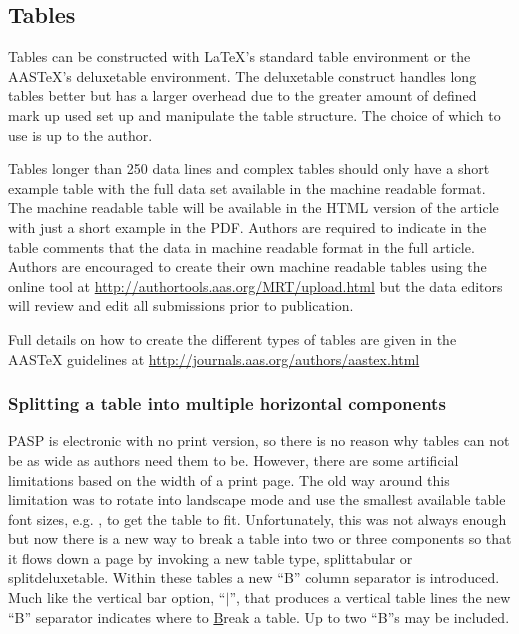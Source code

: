 \documentclass[linenumbers]{aastex631}
\newcommand\aastex{AAS\TeX}
\newcommand\latex{La\TeX}
\begin{document}
\subsection{Tables} \label{subsec:tables}

Tables can be constructed with \latex's standard table environment or the
\aastex's deluxetable environment. The deluxetable construct handles long
tables better but has a larger overhead due to the greater amount of
defined mark up used set up and manipulate the table structure.  The choice
of which to use is up to the author. 

Tables longer than 250 data lines and complex tables should only have a
short example table with the full data set available in the machine
readable format.  The machine readable table will be available in the HTML
version of the article with just a short example in the PDF. Authors are
required to indicate in the table comments that the data in machine 
readable format in the full article.
Authors are encouraged to create their own machine
readable tables using the online tool at
\url{http://authortools.aas.org/MRT/upload.html} but the data editors will review and edit all submissions prior to publication.

Full details on how to create the different types of tables are given in the AASTeX guidelines at \url{http://journals.aas.org/authors/aastex.html}

\subsubsection{Splitting a table into multiple horizontal components}

PASP is electronic with no print version, so there is
no reason why tables can not be as wide as authors need them to be.
However, there are some artificial limitations based on the width of a
print page.  The old way around this limitation was to rotate into 
landscape mode and use the smallest available table font
sizes, e.g. {\tt\string\tablewidth}, to get the table to fit.
Unfortunately, this was not always enough but now there is a new way to break
a table into two or three components so that it flows down a page by
invoking a new table type, splittabular or splitdeluxetable. Within these
tables a new ``B'' column separator is introduced.  Much like the vertical
bar option, ``$\vert$'', that produces a vertical table lines 
the new ``B'' separator indicates where to \underline{B}reak
a table.  Up to two ``B''s may be included.
\end{document}
